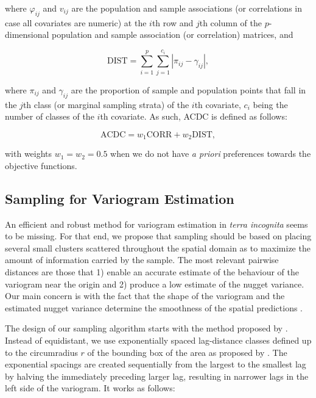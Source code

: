 \noindent where $\varphi_{ij}$ and $v_{ij}$ are the population and sample associations (or correlations in case 
all covariates are numeric) at the $i$th row and $j$th column of the $p$-dimensional population and sample 
association (or correlation) matrices, and

\begin{equation} %
 \text{DIST} = \sum_{i=1}^{p}\sum_{j=1}^{c_i} |\pi_{ij} - \gamma_{ij}|,
\end{equation}\label{eqn:chap09-dist}

\noindent where $\pi_{ij}$ and $\gamma_{ij}$ are the proportion of sample and population points that fall in 
the $j$th class (or marginal sampling strata) of the $i$th covariate, $c_i$ being the number of classes of the 
$i$th covariate. As such, ACDC is defined as follows:

\begin{equation} %
 \text{ACDC} = w_1\text{CORR} + w_2 \text{DIST},
\end{equation}\label{eqn:chap08-acdc}

\noindent with weights $w_1 = w_2 = 0.5$ when we do not have \emph{a priori} preferences towards the objective 
functions.

\subsection{Sampling for Variogram Estimation}

An efficient and robust method for variogram estimation in \emph{terra incognita} seems to be missing. For that 
end, we propose that sampling should be based on placing several small clusters scattered throughout the 
spatial domain as to maximize the amount of information carried by the sample. The most relevant pairwise 
distances are those that 1) enable an accurate estimate of the 
behaviour of the variogram near the origin and 2) produce a low estimate of the nugget variance. Our main 
concern 
is with the fact that the shape of the variogram and the estimated nugget variance determine the smoothness of 
the spatial predictions \cite{WebsterEtAl2007}.

The design of our sampling algorithm starts with the method proposed by \citet{WarrickEtAl1987}. Instead of 
equidistant, we use exponentially spaced lag-distance classes defined up to the circumradius $r$ of the 
bounding box of the area as proposed by \citet{TruongEtAl2013}. The exponential spacings are created 
sequentially from the largest to the smallest lag by halving the immediately preceding larger lag, resulting in 
narrower lags in the left side of the variogram. It works as follows:

